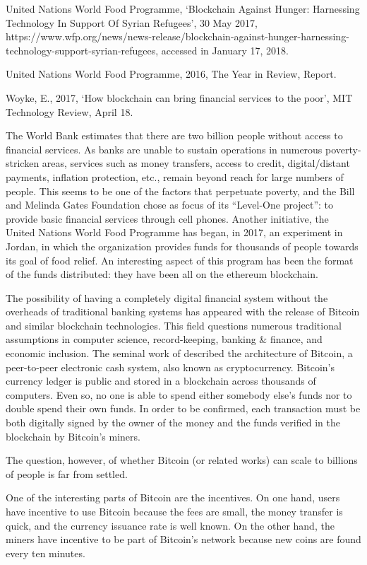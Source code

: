 United Nations World Food Programme, `Blockchain Against Hunger: Harnessing Technology In Support Of Syrian Refugees', 30 May 2017, https://www.wfp.org/news/news-release/blockchain-against-hunger-harnessing-technology-support-syrian-refugees, accessed in January 17, 2018.

United Nations World Food Programme, 2016, The Year in Review, Report.

Woyke, E., 2017, `How blockchain can bring financial services to the poor', MIT Technology Review, April 18. 

 

The World Bank estimates that there are two billion people without access to financial services. As banks are unable to sustain operations in numerous poverty-stricken areas, services such as money transfers, access to credit, digital/distant payments, inflation protection, etc., remain beyond reach for large numbers of people.  This seems to be one of the factors that perpetuate poverty, and the Bill and Melinda Gates Foundation chose as focus of its ``Level-One project'': to provide basic financial services through cell phones. Another initiative, the United Nations World Food Programme has began, in 2017, an experiment in Jordan, in which the organization provides funds for thousands of people towards its goal of food relief.  An interesting aspect of this program has been the format of the funds distributed:  they have been all on the ethereum blockchain.

The possibility of having a completely digital financial system without the overheads of traditional banking systems has appeared with the release of Bitcoin and similar blockchain technologies.  This field questions numerous traditional assumptions in computer science, record-keeping, banking \& finance, and economic inclusion. The seminal work of \citet{nakamoto2008bitcoin} described the architecture of Bitcoin, a peer-to-peer electronic cash system, also known as cryptocurrency. Bitcoin's currency ledger is public and stored in a blockchain across thousands of computers. Even so, no one is able to spend either somebody else's funds nor to double spend their own funds. In order to be confirmed, each transaction must be both digitally signed by the owner of the money and the funds verified in the blockchain by Bitcoin's miners. 

The question, however, of whether Bitcoin (or related works) can scale to billions of people is far from settled. 

One of the interesting parts of Bitcoin are the incentives. On one hand, users have incentive to use Bitcoin because the fees are small, the money transfer is quick, and the currency issuance rate is well known. On the other hand, the miners have incentive to be part of Bitcoin's network because new coins are found every ten minutes.

